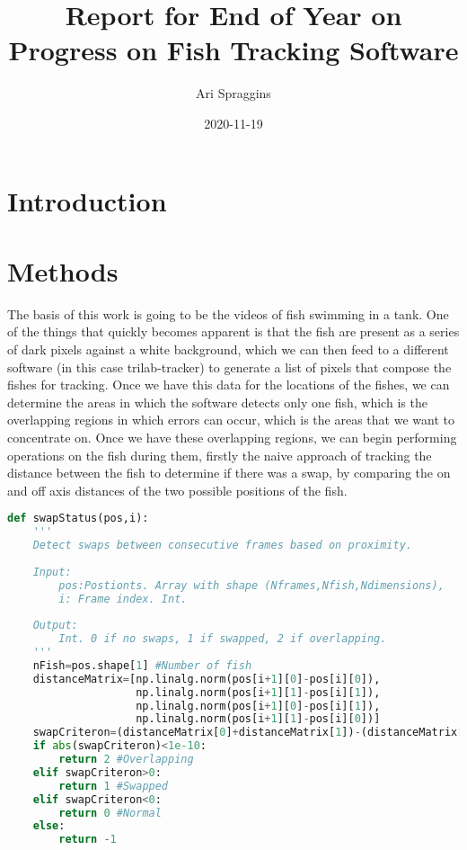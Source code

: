\documentclass[12pt]{article}
\title{Report for End of Year on Progress on Fish Tracking Software}
\author{Ari Spraggins}
\date{2020-11-19}
\begin{document}
\maketitle
{}

\section{Introduction}


\section{Methods}

The basis of this work is going to be the videos of fish swimming in a tank. One of the things that quickly becomes apparent is that the fish are present as a series of dark pixels against a white background, which we can then feed to a different software (in this case trilab-tracker) to generate a list of pixels that compose the fishes for tracking. Once we have this data for the locations of the fishes, we can determine the areas in which the software detects only one fish, which is the overlapping regions in which errors can occur, which is the areas that we want to concentrate on. Once we have these overlapping regions, we can begin performing operations on the fish during them, firstly the naive approach of tracking the distance between the fish to determine if there was a swap, by comparing the on and off axis distances of the two possible positions of the fish.

\begin{minipage}[c]{\textwidth}
\begin{lstlisting}[language=Python]
def swapStatus(pos,i):
    '''
    Detect swaps between consecutive frames based on proximity.
    
    Input:
        pos:Postionts. Array with shape (Nframes,Nfish,Ndimensions),
        i: Frame index. Int.
    
    Output:
        Int. 0 if no swaps, 1 if swapped, 2 if overlapping.
    '''
    nFish=pos.shape[1] #Number of fish
    distanceMatrix=[np.linalg.norm(pos[i+1][0]-pos[i][0]),
                    np.linalg.norm(pos[i+1][1]-pos[i][1]),
                    np.linalg.norm(pos[i+1][0]-pos[i][1]),
                    np.linalg.norm(pos[i+1][1]-pos[i][0])]
    swapCriteron=(distanceMatrix[0]+distanceMatrix[1])-(distanceMatrix[2]+distanceMatrix[3])
    if abs(swapCriteron)<1e-10:
        return 2 #Overlapping
    elif swapCriteron>0:
        return 1 #Swapped
    elif swapCriteron<0:
        return 0 #Normal
    else:
        return -1
\end{lstlisting}
\end{minipage}
\end{document}
